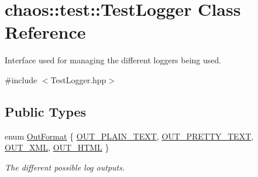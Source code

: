 \hypertarget{classchaos_1_1test_1_1_test_logger}{}\section{chaos\+:\+:test\+:\+:Test\+Logger Class Reference}
\label{classchaos_1_1test_1_1_test_logger}


Interface used for managing the different loggers being used.  




{\ttfamily \#include $<$Test\+Logger.\+hpp$>$}

\subsection*{Public Types}
\begin{DoxyCompactItemize}
\item 
enum \hyperlink{classchaos_1_1test_1_1_test_logger_a8e6f679501d623e41ac0f0c445a7820d}{Out\+Format} \{ \hyperlink{classchaos_1_1test_1_1_test_logger_a8e6f679501d623e41ac0f0c445a7820da1a2f59f0cda45e5e885203795f8b4ea5}{O\+U\+T\+\_\+\+P\+L\+A\+I\+N\+\_\+\+T\+E\+X\+T}, 
\hyperlink{classchaos_1_1test_1_1_test_logger_a8e6f679501d623e41ac0f0c445a7820da1df1af0bb0daa7976737fe1724966df2}{O\+U\+T\+\_\+\+P\+R\+E\+T\+T\+Y\+\_\+\+T\+E\+X\+T}, 
\hyperlink{classchaos_1_1test_1_1_test_logger_a8e6f679501d623e41ac0f0c445a7820da6a80efff59f1f2addd6f2b337579a2c0}{O\+U\+T\+\_\+\+X\+M\+L}, 
\hyperlink{classchaos_1_1test_1_1_test_logger_a8e6f679501d623e41ac0f0c445a7820da278e04e01eafa1f1ddca6ec7cc1ca576}{O\+U\+T\+\_\+\+H\+T\+M\+L}
 \}\begin{DoxyCompactList}\small\item\em The different possible log outputs. \end{DoxyCompactList}
\end{DoxyCompactItemize}
